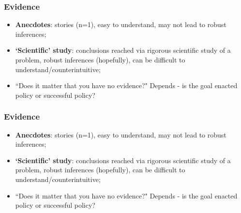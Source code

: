 \documentclass[aspectratio=169]{beamer}
\theoremstyle{principle}
\begin{document}
%

\begin{frame}
\frametitle{Evidence}

\begin{itemize}
\item \textbf{Anecdotes}: \color{white}stories (n=1), easy to understand, may not lead to robust inferences;\color{black}
\bigskip
\bigskip
\item \textbf{`Scientific' study}: \color{white}conclusions reached via rigorous scientific study of a problem, robust inferences (hopefully), can be difficult to understand/counterintuitive;\color{black}
\bigskip
\bigskip
\item ``Does it matter that you have no evidence?"  \color{white}Depends - is the goal enacted policy or successful policy?
\end{itemize}
\end{frame}

\begin{frame}
\frametitle{Evidence}

\begin{itemize}
\item \textbf{Anecdotes}: stories (n=1), easy to understand, may not lead to robust inferences;
\bigskip
\bigskip
\item \textbf{`Scientific' study}: conclusions reached via rigorous scientific study of a problem, robust inferences (hopefully), can be difficult to understand/counterintuitive;
\bigskip
\bigskip
\item ``Does it matter that you have no evidence?"  Depends - is the goal enacted policy or successful policy?
\end{itemize}
\end{frame}
\end{document}

